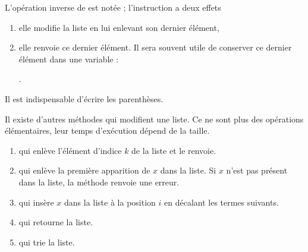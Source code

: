 L'opération inverse de  est notée  ; l'instruction  a deux effets
\begin{enumerate}
\item elle modifie la liste en lui enlevant son dernier élément,
\item elle renvoie ce dernier élément. Il sera souvent utile de conserver ce dernier élément dans une variable : 

.
\end{enumerate}
Il est indispensable d'écrire les parenthèses.

\medskip

Il existe d'autres méthodes qui modifient une liste. Ce ne sont plus des opérations élémentaires, leur temps d'exécution dépend de la taille.
\begin{enumerate}
\item {} qui enlève l'élément d'indice $k$ de la liste et le renvoie. 
\item {} qui enlève la première apparition de $x$ dans la liste. Si $x$ n'est pas présent dans la liste, la méthode renvoie une erreur.
\item {} qui insère $x$ dans la liste à la position $i$ en décalant les termes suivants. 
\item {} qui retourne la liste. 
\item {} qui trie la liste. 
\end{enumerate}


\medskip


